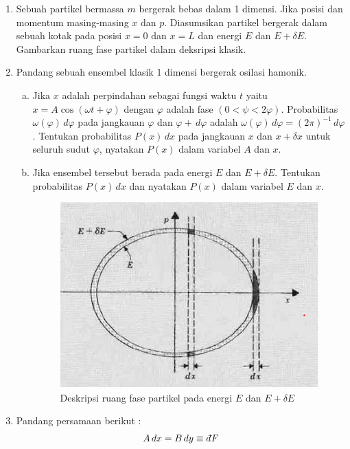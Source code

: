     \begin{enumerate}
        \item Sebuah partikel bermassa $m$ bergerak bebas dalam 1 dimensi. Jika posisi dan momentum masing-masing $x$ dan $p$. Diasumsikan partikel bergerak dalam sebuah kotak pada posisi $x=0$ dan $x=L$ dan energi $E$ dan $E+\delta E$. Gambarkan ruang fase partikel dalam deksripsi klasik.
        \item Pandang sebuah ensembel klasik 1 dimensi bergerak osilasi hamonik.
        \begin{enumerate}[(a)]
            \item Jika $x$ adalah perpindahan sebagai fungsi waktu $t$ yaitu $x=A\cos(\omega t+\varphi)$ dengan $\varphi$ adalah fase $(0<\psi<2\varphi)$. Probabilitas $\omega(\varphi)\,d\varphi$ pada jangkauan $\varphi$ dan $\varphi+\,d\varphi$ adalah $\omega(\varphi)\,d\varphi=(2\pi)^{-1}\,d\varphi$. Tentukan probabilitas $P(x)\,dx$ pada jangkauan $x$ dan $x+\delta x$ untuk seluruh sudut $\varphi$, nyatakan $P(x)$ dalam variabel $A$ dan $x$.
            \item Jika ensembel tersebut berada pada energi $E$ dan $E+\delta E$. Tentukan probabilitas $P(x)\,dx$ dan nyatakan $P(x)$ dalam variabel $E$ dan $x$.
            \newpage
            \begin{figure}[htp]
                \centering
                \includegraphics[width=10cm]{pic/2bab2.png}
                \caption{Deskripsi ruang fase partikel pada energi $E$ dan $E+\delta E$}
            \end{figure}
        \end{enumerate}
        \item Pandang persamaan berikut :
        \begin{equation*}
            A\,dx=B\,dy\equiv d\hspace*{-0.08em}\bar{}\hspace*{0.1em} F
        \end{equation*}

\end{enumerate}
